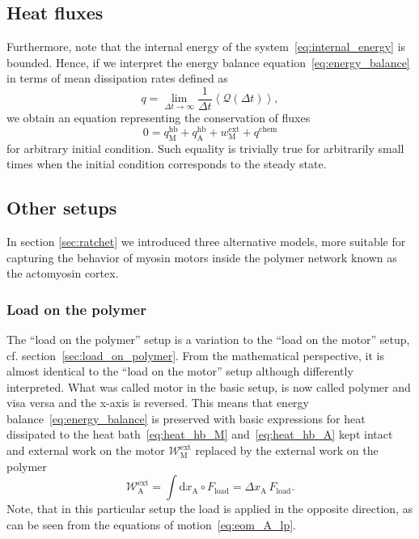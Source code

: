 \documentclass[aps,pre,twocolumn,showpacs,showkeys,superscriptaddress,floatfix]{revtex4-1}
\newcommand{\rmd}{{\mathrm d}}
\begin{document}
\subsection{Heat fluxes}
Furthermore, note that the internal energy of the system~\eqref{eq:internal_energy} is bounded.
Hence, if we interpret the energy balance equation~\eqref{eq:energy_balance} in terms of mean dissipation rates defined as 
\begin{equation}
q = \lim_{\Delta t \to \infty} \frac{1}{\Delta t} \left\langle {\mathcal Q}(\Delta t) \right\rangle ,
\label{eq:heat_flux}
\end{equation}
we obtain an equation representing the conservation of fluxes 
\begin{equation}
0 = q_\text{M}^\text{hb} + q_\text{A}^\text{hb} + w^\text{ext}_\text{M} + q^\text{chem} 
\label{eq:heat_flux_balance}
\end{equation}
for arbitrary initial condition. 
Such equality is trivially true for arbitrarily small times when the initial condition corresponds to the steady state.


\subsection{Other setups} 
In section \ref{sec:ratchet} we introduced three alternative models, 
more suitable for capturing the behavior of myosin motors inside the polymer network known as the actomyosin cortex.

\subsubsection{Load on the polymer}
The ``load on the polymer'' setup is a variation to the ``load on the motor'' setup, cf. section~\ref{sec:load_on_polymer}. 
From the mathematical perspective, it is almost identical to the ``load on the motor'' setup although differently interpreted. 
What was called motor in the basic setup, is now called polymer and visa versa
and the x-axis is reversed.
This means that energy balance~\eqref{eq:energy_balance} is preserved 
with basic expressions for heat dissipated to the heat bath~\eqref{eq:heat_hb_M} and~\eqref{eq:heat_hb_A} kept intact 
and external work on the motor ${\mathcal W}_\text{M}^\text{ext}$ replaced by the external work on the polymer
\[
{\mathcal W}_\text{A}^\text{ext} = \int \rmd x_\text{A} \circ F_\text{load} = \Delta x_\text{A} \, F_\text{load} . 
\]
Note, that in this particular setup the load is applied in the opposite direction, as can be seen from the equations of motion~\eqref{eq:eom_A_lp}. 
\end{document}
